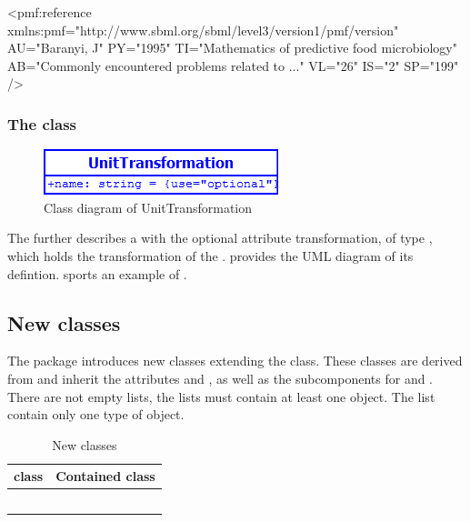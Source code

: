 \begin{example}
<pmf:reference
  xmlns:pmf="http://www.sbml.org/sbml/level3/version1/pmf/version"
  AU="Baranyi, J" PY="1995" TI="Mathematics of predictive food microbiology"
  AB="Commonly encountered problems related to ..." VL="26" IS="2" SP="199" />
\end{example}

\subsubsection{The  class}
\begin{figure}
	\includegraphics[scale=0.8]{img/UnitTransformation}
	\caption{Class diagram of UnitTransformation}
	\label{UnitTransformation}
\end{figure}

\label{unittransformation-class}
The \UnitTransformation further describes a \UnitDefinition with the optional
attribute transformation, of type , which holds the
transformation of the \UnitDefinition.  provides the
UML diagram of its defintion.  sports an example of
\UnitTransformation.

\subsection{New \ListOf classes}
The \Pmf package introduces new classes extending the \ListOf class. These
classes are derived from \SBase and inherit the attributes  and
, as well as the subcomponents for \Annotation and \Notes. There
are not empty lists, the lists must contain at least one object. The list
contain only one type of object.

\begin{table}
	\begin{tabular}{|l|l|}
		\hline
		\textbf{\ListOf class} & \textbf{Contained class}\\
		\hline
		\ListOfCorrelations & \Correlation\\
		\ListOfDataSources & \DataSource\\
		\ListOfModelVariables & \ModelVariable\\
		\ListOfPrimaryModels & \PrimaryModel\\
		\ListOfReferences & \Reference\\
		\hline
	\end{tabular}
	\caption{New \ListOf classes}
	\label{listof-classes}
\end{table}


